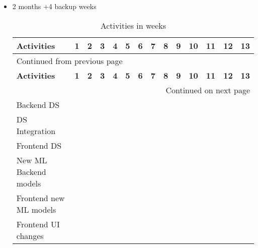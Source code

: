\documentclass[a4paper]{article}
\begin{document}
\begin{itemize}
\item 2 months +4 backup weeks

\begin{longtable}{llllllllllllll}
\caption{Activities in weeks}
\\[0pt]
\cellcolor{gray!16} \textbf{Activities} & \cellcolor{gray!16} \textbf{1} & \cellcolor{gray!16} \textbf{2} & \cellcolor{gray!16} \textbf{3} & \cellcolor{gray!16} \textbf{4} & \cellcolor{gray!16} \textbf{5} & \cellcolor{gray!16} \textbf{6} & \cellcolor{gray!16} \textbf{7} & \cellcolor{gray!16} \textbf{8} & \cellcolor{gray!16} \textbf{9} & \cellcolor{gray!16} \textbf{10} & \cellcolor{gray!16} \textbf{11} & \cellcolor{gray!16} \textbf{12} & \cellcolor{gray!16} \textbf{13}\\[0pt]
\hline
\endfirsthead
\multicolumn{14}{l}{Continued from previous page} \\[0pt]
\hline

\cellcolor{gray!16} \textbf{Activities} & \cellcolor{gray!16} \textbf{1} & \cellcolor{gray!16} \textbf{2} & \cellcolor{gray!16} \textbf{3} & \cellcolor{gray!16} \textbf{4} & \cellcolor{gray!16} \textbf{5} & \cellcolor{gray!16} \textbf{6} & \cellcolor{gray!16} \textbf{7} & \cellcolor{gray!16} \textbf{8} & \cellcolor{gray!16} \textbf{9} & \cellcolor{gray!16} \textbf{10} & \cellcolor{gray!16} \textbf{11} & \cellcolor{gray!16} \textbf{12} & \cellcolor{gray!16} \textbf{13} \\[0pt]

\hline
\endhead
\hline\multicolumn{14}{r}{Continued on next page} \\
\endfoot
\endlastfoot
\hline
\cellcolor{gray!16}Backend DS & \cellcolor{blue!16} & \cellcolor{blue!16} &  &  &  &  &  &  &  &  &  &  & \\[0pt]
\cellcolor{gray!16}DS Integration &  & \cellcolor{blue!32} & \cellcolor{blue!32} & \cellcolor{blue!32} & \cellcolor{blue!32} & \cellcolor{blue!32} &  &  &  &  &  &  & \\[0pt]
\cellcolor{gray!16}Frontend DS &  &  &  & \cellcolor{blue!16} & \cellcolor{blue!16} & \cellcolor{blue!16} & \cellcolor{blue!16} &  &  &  &  &  & \\[0pt]
\cellcolor{gray!16}New ML Backend models &  &  & \cellcolor{blue!32} & \cellcolor{blue!32} & \cellcolor{blue!32} &  &  &  &  &  &  &  & \\[0pt]
\cellcolor{gray!16}Frontend new ML models &  &  &  &  &  & \cellcolor{blue!16} & \cellcolor{blue!16} & \cellcolor{blue!16} &  &  &  &  & \\[0pt]
\cellcolor{gray!16}Frontend UI changes &  &  &  &  &  &  & \cellcolor{blue!32} & \cellcolor{blue!32} & \cellcolor{blue!32} & \cellcolor{blue!32} & \cellcolor{blue!32} & \cellcolor{blue!32} & \cellcolor{blue!32}\\[0pt]
\end{longtable}
\end{itemize}
\end{document}
